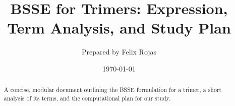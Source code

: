 \documentclass[11pt]{article}
\title{BSSE for Trimers: Expression, Term Analysis, and Study Plan}
\author{Prepared by Felix Rojas}
\date{\today}
\begin{document}
\maketitle

\begin{abstract}
A concise, modular document outlining the BSSE formulation for a trimer,
a short analysis of its terms, and the computational plan for our study.
\end{abstract}

\tableofcontents
\clearpage





\clearpage
\appendix
{} %

   

\printbibliography
\end{document}
